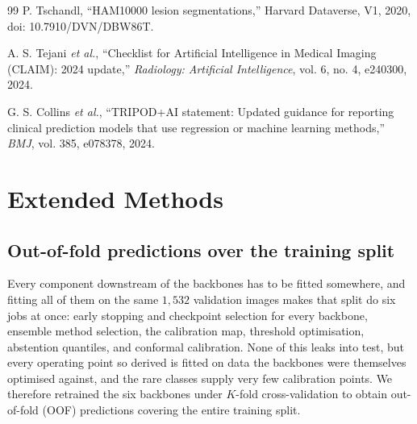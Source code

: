 \documentclass[journal]{IEEEtran}
\begin{document}
\begin{thebibliography}{99}
 P. Tschandl, ``HAM10000 lesion segmentations,'' Harvard
Dataverse, V1, 2020, doi: 10.7910/DVN/DBW86T.

 A. S. Tejani \emph{et al.}, ``Checklist for Artificial Intelligence
in Medical Imaging (CLAIM): 2024 update,'' \emph{Radiology: Artificial Intelligence}, vol. 6,
no. 4, e240300, 2024.

 G. S. Collins \emph{et al.}, ``TRIPOD+AI statement: Updated
guidance for reporting clinical prediction models that use regression or machine learning
methods,'' \emph{BMJ}, vol. 385, e078378, 2024.

\end{thebibliography}

%
%
%
\clearpage
\appendices

\section{Extended Methods}
\label{app:extmethods}

\subsection{Out-of-fold predictions over the training split}
\label{sec:oof}
Every component downstream of the backbones has to be fitted somewhere, and fitting all of
them on the same $1{,}532$ validation images makes that split do six jobs at once: early
stopping and checkpoint selection for every backbone, ensemble method selection, the
calibration map, threshold optimisation, abstention quantiles, and conformal calibration.
None of this leaks into test, but every operating point so derived is fitted on data the
backbones were themselves optimised against, and the rare classes supply very few calibration
points. We therefore retrained the six backbones under $K$-fold cross-validation to obtain
out-of-fold (OOF) predictions covering the entire training split.
\end{document}
